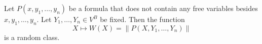 Let $P(x, y_1, \ldots, y_n)$ be a formula that does not contain any free variables besides $x, y_1, \ldots, y_n$. Let $Y_1, \ldots, Y_n \in V^B$ be fixed. Then the function
$$X \mapsto W(X) = \|P(X, Y_1, \ldots, Y_n)\|$$
is a random class.